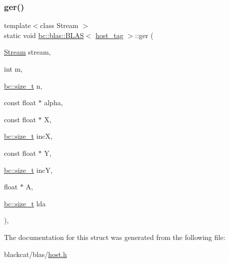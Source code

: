 \subsubsection{\texorpdfstring{ger()}{ger()}\hspace{0.1cm}{\footnotesize\ttfamily [2/2]}}
{\footnotesize\ttfamily template$<$class Stream $>$ \\
static void \hyperlink{structbc_1_1blas_1_1BLAS}{bc\+::blas\+::\+B\+L\+AS}$<$ \hyperlink{structbc_1_1host__tag}{host\+\_\+tag} $>$\+::ger (\begin{DoxyParamCaption}\item[{\hyperlink{classbc_1_1streams_1_1Stream}{Stream}}]{stream,  }\item[{int}]{m,  }\item[{\hyperlink{namespacebc_aaf8e3fbf99b04b1b57c4f80c6f55d3c5}{bc\+::size\+\_\+t}}]{n,  }\item[{const float $\ast$}]{alpha,  }\item[{const float $\ast$}]{X,  }\item[{\hyperlink{namespacebc_aaf8e3fbf99b04b1b57c4f80c6f55d3c5}{bc\+::size\+\_\+t}}]{incX,  }\item[{const float $\ast$}]{Y,  }\item[{\hyperlink{namespacebc_aaf8e3fbf99b04b1b57c4f80c6f55d3c5}{bc\+::size\+\_\+t}}]{incY,  }\item[{float $\ast$}]{A,  }\item[{\hyperlink{namespacebc_aaf8e3fbf99b04b1b57c4f80c6f55d3c5}{bc\+::size\+\_\+t}}]{lda }\end{DoxyParamCaption})\hspace{0.3cm}{\ttfamily [inline]}, {\ttfamily [static]}}



The documentation for this struct was generated from the following file\+:\begin{DoxyCompactItemize}
\item 
blackcat/blas/\hyperlink{blas_2host_8h}{host.\+h}\end{DoxyCompactItemize}
